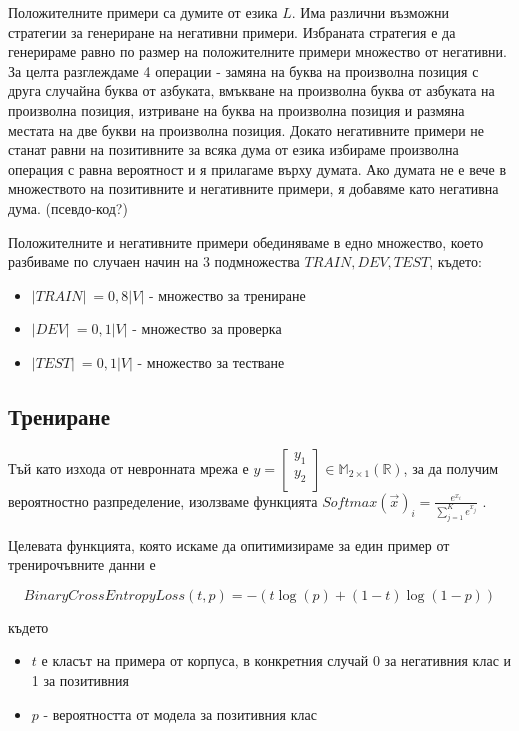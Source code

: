\documentclass[a4paper,12pt]{article}
\begin{document}
Положителните примери са думите от езика $L$. Има различни възможни стратегии за генериране на негативни примери. Избраната стратегия е да генерираме равно по размер на положителните примери множество от негативни. За целта разглеждаме 4 операции - замяна на буква на произволна позиция с друга случайна буква от азбуката, вмъкване на произволна буква от азбуката на произволна позиция, изтриване на буква на произволна позиция и размяна местата на две букви на произволна позиция. Докато негативните примери не станат равни на позитивните за всяка дума от езика избираме произволна операция с равна вероятност и я прилагаме върху думата. Ако думата не е вече в множеството на позитивните и негативните примери, я добавяме като негативна дума. (псевдо-код?)

Положителните и негативните примери обединяваме в едно множество, което разбиваме по случаен начин на 3 подмножества $TRAIN, DEV, TEST$, където:
\begin{itemize}
 \item $|TRAIN|\:= 0,8|V|$ - множество за трениране
 \item $|DEV|\:= 0,1|V|$ - множество за проверка
 \item $|TEST|\:= 0,1|V|$ - множество за тестване
\end{itemize}

\subsection{Трениране}

Тъй като изхода от невронната мрежа е $y = \begin{bmatrix}
  y_1 \\ 
  y_2 \\ 
\end{bmatrix} \in \mathbb{M}_{2 \times 1} (\mathbb{R})$, за да получим вероятностно разпределение, изолзваме функцията ${Softmax(\vec{x})}_i = \frac{e^{x_i}}{\sum_{j=1}^{K}e^{x_j}}$ . 

Целевата функцията, която искаме да опитимизираме за един пример от тренирочъвните данни е

\begin{equation} \label{eqn}
BinaryCrossEntropyLoss(t, p) = -(t\log(p) + (1-t)\log(1-p))
\end{equation}

където

\begin{itemize}
 \item $t$ е класът на примера от корпуса, в конкретния случай 0 за негативния клас и 1 за позитивния
 \item $p$ - вероятността от модела за позитивния клас
\end{itemize}
\end{document}
